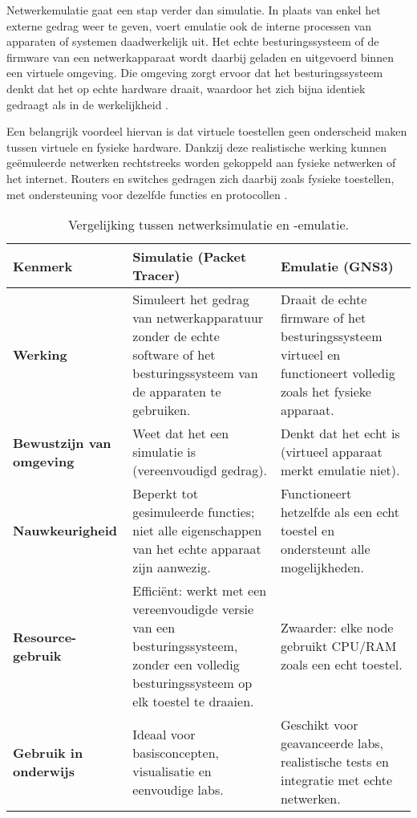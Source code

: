 \vspace{0.2cm}

Netwerkemulatie gaat een stap verder dan simulatie. In plaats van enkel het externe gedrag weer te geven, voert emulatie ook de interne processen van apparaten of systemen daadwerkelijk uit. Het echte besturingssysteem of de firmware van een netwerkapparaat wordt daarbij geladen en uitgevoerd binnen een virtuele omgeving. Die omgeving zorgt ervoor dat het besturingssysteem denkt dat het op echte hardware draait, waardoor het zich bijna identiek gedraagt als in de werkelijkheid \autocite{asee_peer_2016}.

\vspace{0.2cm}

Een belangrijk voordeel hiervan is dat virtuele toestellen geen onderscheid maken tussen virtuele en fysieke hardware. Dankzij deze realistische werking kunnen geëmuleerde netwerken rechtstreeks worden gekoppeld aan fysieke netwerken of het internet. Routers en switches gedragen zich daarbij zoals fysieke toestellen, met ondersteuning voor dezelfde functies en protocollen \autocite{asee_peer_2016}.


\begin{table}[H]
    \centering
    \caption{Vergelijking tussen netwerksimulatie en -emulatie.}
    \label{tab:sim_vs_emul}
    \begin{tabularx}{\textwidth}{|l|X|X|}
        \hline
        \textbf{Kenmerk} & \textbf{Simulatie (Packet Tracer)} & \textbf{Emulatie (GNS3)} \\
        \hline
        \textbf{Werking} & Simuleert het gedrag van netwerkapparatuur zonder de echte software of het besturingssysteem van de apparaten te gebruiken. & Draait de echte firmware of het besturingssysteem virtueel en functioneert volledig zoals het fysieke apparaat. \\
        \hline
        \textbf{Bewustzijn van omgeving} & Weet dat het een simulatie is (vereenvoudigd gedrag). & Denkt dat het echt is (virtueel apparaat merkt emulatie niet). \\
        \hline
        \textbf{Nauwkeurigheid} & Beperkt tot gesimuleerde functies; niet alle eigenschappen van het echte apparaat zijn aanwezig. & Functioneert hetzelfde als een echt toestel en ondersteunt alle mogelijkheden. \\
        \hline
        \textbf{Resource-gebruik} & Efficiënt: werkt met een vereenvoudigde versie van een besturingssysteem, zonder een volledig besturingssysteem op elk toestel te draaien. & Zwaarder: elke node gebruikt CPU/RAM zoals een echt toestel. \\
        \hline
        \textbf{Gebruik in onderwijs} & Ideaal voor basisconcepten, visualisatie en eenvoudige labs. & Geschikt voor geavanceerde labs, realistische tests en integratie met echte netwerken. \\
        \hline

        
    \end{tabularx}
\noindent\footnotesize{\autocite{asee_peer_2016, GOMEZ2023}}
\end{table}


